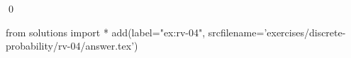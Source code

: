 
\begin{ex} 
  \label{ex:rv-04}
  
  \qed
\end{ex} 
\begin{python0}
from solutions import *
add(label="ex:rv-04",
    srcfilename='exercises/discrete-probability/rv-04/answer.tex') 
\end{python0}
